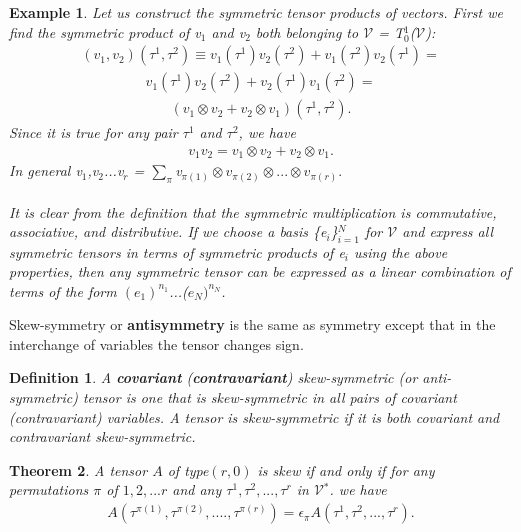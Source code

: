 \documentclass[12pt,a4paper]{article}
\newtheorem{thm}{Theorem}
\newtheorem{defn}[thm]{Definition}
\newtheorem{exmp}{Example}[section]
\begin{document}
\begin{exmp}
Let us construct the symmetric tensor products of vectors. First we find the symmetric product of v$_1$ and v$_2$ both belonging to $\mathcal{V}$ = T$_0^1$($\mathcal{V}$):
\begin{align*}
(v_1,v_2)(\tau^1,\tau^2) \equiv v_1(\tau^1)v_2(\tau^2) + v_1(\tau^2)v_2(\tau^1)=
\end{align*}
\begin{align*}
v_1(\tau^1)v_2(\tau^2) + v_2(\tau^1)v_1(\tau^2)=
\end{align*}
\begin{align*}
(v_1\otimes v_2 + v_2\otimes v_1)(\tau^1,\tau^2).
\end{align*}
Since it is true for any pair $\tau^1$ and $\tau^2$, we have 
\begin{align*}
v_1v_2 = v_1\otimes v_2 + v_2\otimes v_1.
\end{align*}
In general v$_1$,v$_2$...v$_r$ = $\sum_{\pi}$v$_{\pi(1)}\otimes v_{\pi(2)}\otimes ... \otimes v_{\pi(r)}.$\\\\
\hspace{1cm} It is clear from the definition that the symmetric multiplication is commutative, associative, and distributive. If we choose a basis \{e$_i$\}$_{i=1}^N$ for $\mathcal{V}$ and express all symmetric tensors in terms of symmetric products of e$_i$ using the above properties, then any symmetric tensor can be expressed as a linear combination of terms of the form $(e_1)^{n_1}$...($e_N)^{n_N}$.
\end{exmp}
\hspace{1cm} Skew-symmetry or \textbf{antisymmetry} is the same as symmetry except that in the interchange of variables the tensor changes sign.
\begin{defn}
A \textbf{covariant} (\textbf{contravariant}) skew-symmetric (or anti-symmetric) tensor is one that is skew-symmetric in all pairs of covariant (contravariant) variables. A tensor is skew-symmetric if it is both covariant
and contravariant skew-symmetric.
\end{defn}
\begin{thm}
A tensor $A$ of type$(r, 0)$ is skew if and only if for any permutations $\pi$ of $1, 2, ... r$ and any $\tau^1,\tau^2, ..., \tau^r$ in $\mathcal{V}$$^*$. we have
\begin{align*}
A(\tau^{\pi(1)},\tau^{\pi(2)},....,\tau^{\pi(r)}) = \epsilon_\pi A(\tau^1,\tau^2,...,\tau^r).
\end{align*}
\end{thm}
\end{document}
